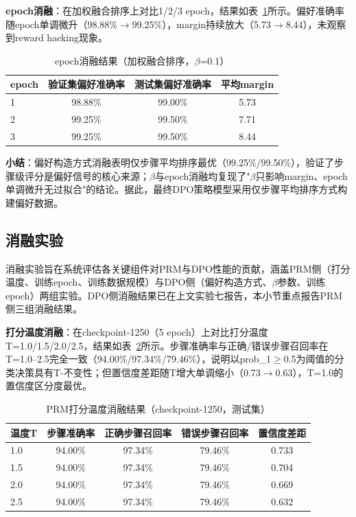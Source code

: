 \documentclass[professional,privacy,print,win,long,STEM,AutoFakeBold]{def/buaa}
\begin{document}
\textbf{epoch消融}：在加权融合排序上对比1/2/3 epoch，结果如表~\ref{tab:abl-epoch}所示。偏好准确率随epoch单调微升（98.88\%$\rightarrow$99.25\%），margin持续放大（5.73$\rightarrow$8.44），未观察到reward hacking现象。

\begin{table}[h]
\centering
\caption{epoch消融结果（加权融合排序，$\beta$=0.1）}
\label{tab:abl-epoch}
\begin{tabular}{lccc}
\toprule
epoch & 验证集偏好准确率 & 测试集偏好准确率 & 平均margin \\
\midrule
1 & 98.88\% & 99.00\% & 5.73 \\
2 & 99.25\% & 99.50\% & 7.71 \\
3 & 99.25\% & 99.50\% & 8.44 \\
\bottomrule
\end{tabular}
\end{table}

\textbf{小结}：偏好构造方式消融表明仅步骤平均排序最优（99.25\%/99.50\%），验证了步骤级评分是偏好信号的核心来源；$\beta$与epoch消融均复现了"$\beta$只影响margin、epoch单调微升无过拟合"的结论。据此，最终DPO策略模型采用仅步骤平均排序方式构建偏好数据。

\subsection{消融实验}

消融实验旨在系统评估各关键组件对PRM与DPO性能的贡献，涵盖PRM侧（打分温度、训练epoch、训练数据规模）与DPO侧（偏好构造方式、$\beta$参数、训练epoch）两组实验。DPO侧消融结果已在上文实验七报告，本小节重点报告PRM侧三组消融结果。

\textbf{打分温度消融}：在checkpoint-1250（5 epoch）上对比打分温度T=1.0/1.5/2.0/2.5，结果如表~\ref{tab:abl-temp}所示。步骤准确率与正确/错误步骤召回率在T=1.0--2.5完全一致（94.00\%/97.34\%/79.46\%），说明以prob\_1$\geq$0.5为阈值的分类决策具有T-不变性；但置信度差距随T增大单调缩小（0.73$\rightarrow$0.63），T=1.0的置信度区分度最优。

\begin{table}[h]
\centering
\caption{PRM打分温度消融结果（checkpoint-1250，测试集）}
\label{tab:abl-temp}
\begin{tabular}{lcccc}
\toprule
温度T & 步骤准确率 & 正确步骤召回率 & 错误步骤召回率 & 置信度差距 \\
\midrule
1.0 & 94.00\% & 97.34\% & 79.46\% & 0.733 \\
1.5 & 94.00\% & 97.34\% & 79.46\% & 0.704 \\
2.0 & 94.00\% & 97.34\% & 79.46\% & 0.669 \\
2.5 & 94.00\% & 97.34\% & 79.46\% & 0.632 \\
\bottomrule
\end{tabular}
\end{table}
\end{document}
